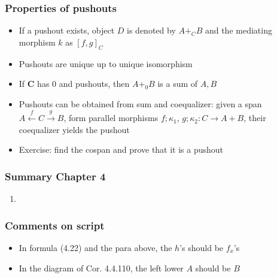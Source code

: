 \documentclass[handout]{beamer}
\newcommand{\bfsf}[1]{{\boldsymbol{#1}}}
\newcommand{\CC}{\bfsf{C}}
\begin{document}
\frame
  {   
    \frametitle{Properties of pushouts}\label{Ch4:PushoProp}

 \begin{itemize}[<+->]
\item If a pushout exists, object $D$ is denoted by $A+_C B$ 
and the mediating morphism $k$ as $[f,g]_C$
\item Pushouts are unique up to unique isomorphism
\item If $\CC$ has 0 and pushouts, then $A+_0 B$ is a sum of $A,B$ 
\item Pushouts can be obtained from sum and coequalizer:
given a span $A\stackrel{f}{\leftarrow} C \stackrel{g}{\to}B$,
form parallel morphisms $f;\kappa_1$, $g;\kappa_2: C\to A+B$,
their coequalizer yields the pushout
\item Exercise: find the cospan and prove that it is a pushout
 \end{itemize}

 }


\frame
  {   
    \frametitle{Summary Chapter 4}\label{Ch4:Summary}

 \begin{enumerate}[<+->]
\item 
 \end{enumerate}


}

\frame
  {   
    \frametitle{Comments on script}\label{Ch4:comments}

 \begin{itemize}[<+->]
\item In formula (4.22) and the para above, the $h$'s should be $f_x$'s
\item In the diagram of Cor. 4.4.110, the left lower $A$ should be $B$
 \end{itemize}

 }
\end{document}
